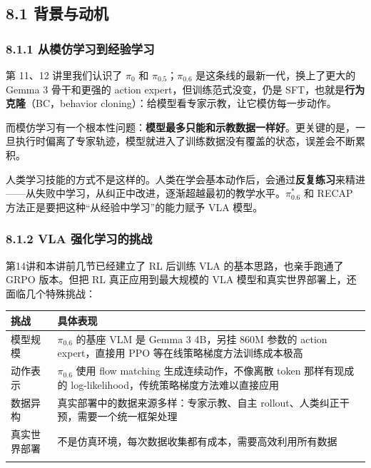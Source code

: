 \documentclass[
  chinese,
]{ctexart}
\begin{document}
\subsection{8.1 背景与动机}\label{ux80ccux666fux4e0eux52a8ux673a-1}

\subsubsection{8.1.1
从模仿学习到经验学习}\label{ux4eceux6a21ux4effux5b66ux4e60ux5230ux7ecfux9a8cux5b66ux4e60}

第 11、12 讲里我们认识了 \(\pi_0\) 和 \(\pi_{0.5}\)；\(\pi_{0.6}\)
是这条线的最新一代，换上了更大的 Gemma 3 骨干和更强的 action
expert，但训练范式没变，仍是 SFT，也就是\textbf{行为克隆}（BC，behavior
cloning）：给模型看专家示教，让它模仿每一步动作。

而模仿学习有一个根本性问题：\textbf{模型最多只能和示教数据一样好}。更关键的是，一旦执行时偏离了专家轨迹，模型就进入了训练数据没有覆盖的状态，误差会不断累积。

人类学习技能的方式不是这样的。人类在学会基本动作后，会通过\textbf{反复练习}来精进------从失败中学习，从纠正中改进，逐渐超越最初的教学水平。\(\pi^{*}_{0.6}\)
和 RECAP 方法正是要把这种``从经验中学习''的能力赋予 VLA 模型。

\subsubsection{8.1.2 VLA
强化学习的挑战}\label{vla-ux5f3aux5316ux5b66ux4e60ux7684ux6311ux6218}

第14讲和本讲前几节已经建立了 RL 后训练 VLA 的基本思路，也亲手跑通了 GRPO
版本。但把 RL 真正应用到最大规模的 VLA
模型和真实世界部署上，还面临几个特殊挑战：

\begin{center}
\begin{tabular}{@{}>{\raggedright\arraybackslash}p{} >{\raggedright\arraybackslash}p{}@{}}
\toprule\noalign{}
挑战 & 具体表现 \\
\midrule\noalign{}
模型规模 & \(\pi_{0.6}\) 的基座 VLM 是 Gemma 3 4B，另挂 860M 参数的 action expert，直接用 PPO 等在线策略梯度方法训练成本极高 \\
动作表示 & \(\pi_{0.6}\) 使用 flow matching 生成连续动作，不像离散 token 那样有现成的 log-likelihood，传统策略梯度方法难以直接应用 \\
数据异构 & 真实部署中的数据来源多样：专家示教、自主 rollout、人类纠正干预，需要一个统一框架处理 \\
真实世界部署 & 不是仿真环境，每次数据收集都有成本，需要高效利用所有数据 \\
\bottomrule\noalign{}
\end{tabular}
\end{center}
\end{document}
